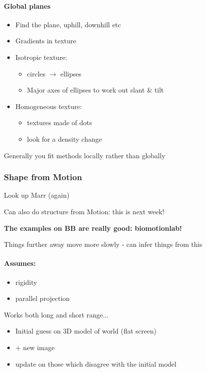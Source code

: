 \documentclass[paper=a4, fontsize=11pt]{article} %
\numberwithin{equation}{section} %
\numberwithin{figure}{section} %
\numberwithin{table}{section} %
\begin{document}
\paragraph{Global planes}
\begin{itemize}
\item Find the plane, uphill, downhill etc
\item Gradients in texture
\item Isotropic texture:
\begin{itemize}
\item circles $\rightarrow$ ellipses
\item Major axes of ellipses to work out slant \& tilt
\end{itemize}
\item Homogeneous texture:
\begin{itemize}
\item textures made of dots
\item look for a density change
\end{itemize}
\end{itemize}

Generally you fit methods locally rather than globally

\subsubsection{Shape from Motion}
Look up Marr (again)

Can also do structure from Motion: this is next week!

\textbf{The examples on BB are really good: biomotionlab!}

Things further away move more slowly - can infer things from this

\paragraph{Assumes:}
\begin{itemize}
\item rigidity 
\item parallel projection
\end{itemize}

Works both long and short range... 

\begin{itemize}
\item Initial guess on 3D model of world (flat screen)
\item + new image
\item update on those which disagree with the initial model
\end{itemize}
\end{document}
